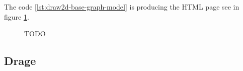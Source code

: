 The code \ref{lst:draw2d-base-graph-model} is producing the HTML page see in figure \ref{fig:base-graph-model-html-draw2d}.

\begin{figure}[h]%
    \centering
    \caption[TODO]{TODO}
    \label{fig:base-graph-model-html-draw2d}
\end{figure}%


\subsection{Drage}



